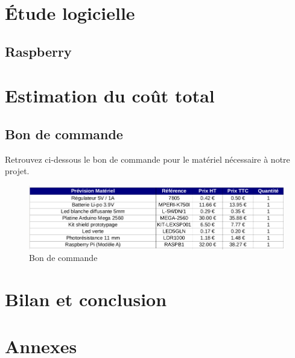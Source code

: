 \documentclass[12pt,titlepage,a4paper]{report}
\begin{document}
	\part{Étude logicielle}
	\chapter{Raspberry}
	\minitoc
	


	\part{Estimation du coût total}
	\chapter{Bon de commande}
	Retrouvez ci-dessous le bon de commande pour le matériel nécessaire à notre projet.
	\begin{figure}[h]
		\centering
		\includegraphics[width=550px]{images/lextronic.png}
		\caption{Bon de commande}
	\end{figure}


	\part{Bilan et conclusion}


	\part{Annexes}
\end{document}
